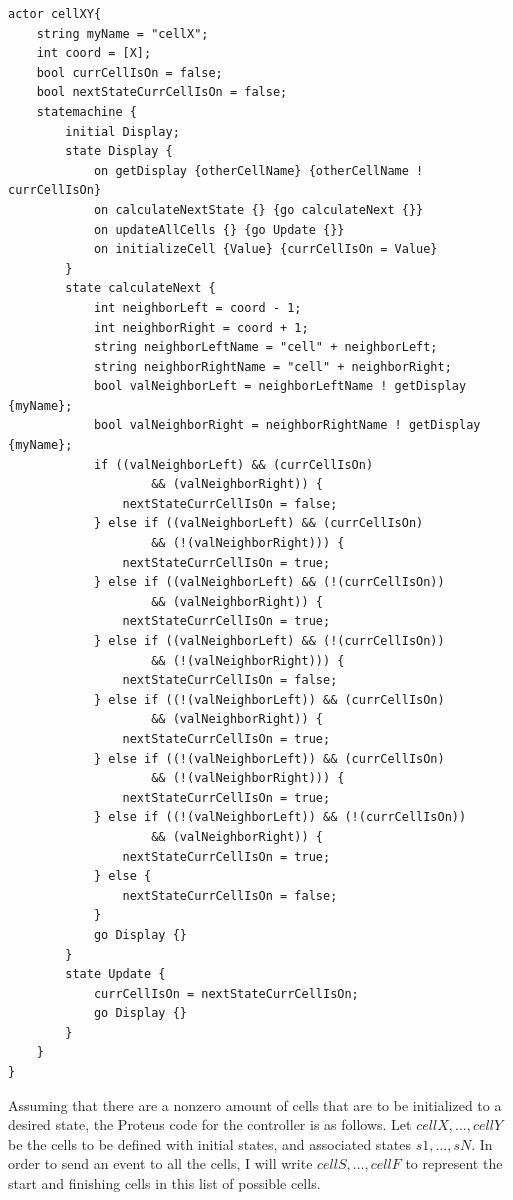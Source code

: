 \begin{verbatim}
actor cellXY{
    string myName = "cellX";
    int coord = [X];
    bool currCellIsOn = false;
    bool nextStateCurrCellIsOn = false;
    statemachine {
        initial Display;
        state Display {
            on getDisplay {otherCellName} {otherCellName ! currCellIsOn}
            on calculateNextState {} {go calculateNext {}}
            on updateAllCells {} {go Update {}}
            on initializeCell {Value} {currCellIsOn = Value}
        }
        state calculateNext {
            int neighborLeft = coord - 1;
            int neighborRight = coord + 1;
            string neighborLeftName = "cell" + neighborLeft;
            string neighborRightName = "cell" + neighborRight;
            bool valNeighborLeft = neighborLeftName ! getDisplay {myName};
            bool valNeighborRight = neighborRightName ! getDisplay {myName};
            if ((valNeighborLeft) && (currCellIsOn) 
                    && (valNeighborRight)) {
                nextStateCurrCellIsOn = false;
            } else if ((valNeighborLeft) && (currCellIsOn) 
                    && (!(valNeighborRight))) {
                nextStateCurrCellIsOn = true;
            } else if ((valNeighborLeft) && (!(currCellIsOn)) 
                    && (valNeighborRight)) {
                nextStateCurrCellIsOn = true;
            } else if ((valNeighborLeft) && (!(currCellIsOn)) 
                    && (!(valNeighborRight))) {
                nextStateCurrCellIsOn = false;
            } else if ((!(valNeighborLeft)) && (currCellIsOn) 
                    && (valNeighborRight)) {
                nextStateCurrCellIsOn = true;
            } else if ((!(valNeighborLeft)) && (currCellIsOn) 
                    && (!(valNeighborRight))) {
                nextStateCurrCellIsOn = true;
            } else if ((!(valNeighborLeft)) && (!(currCellIsOn)) 
                    && (valNeighborRight)) {
                nextStateCurrCellIsOn = true;
            } else {
                nextStateCurrCellIsOn = false;
            }
            go Display {}
        }
        state Update {
            currCellIsOn = nextStateCurrCellIsOn;
            go Display {}
        }
    }
}
\end{verbatim}

Assuming that there are a nonzero amount of cells that are to be initialized to a desired state, the Proteus code for the controller is as follows.
Let $cellX, \dots, cellY$ be the cells to be defined with initial states, and associated states $s1, \dots, sN$.
In order to send an event to all the cells, I will write $cellS, \dots, cellF$ to represent the start and finishing cells in this list of possible cells.

